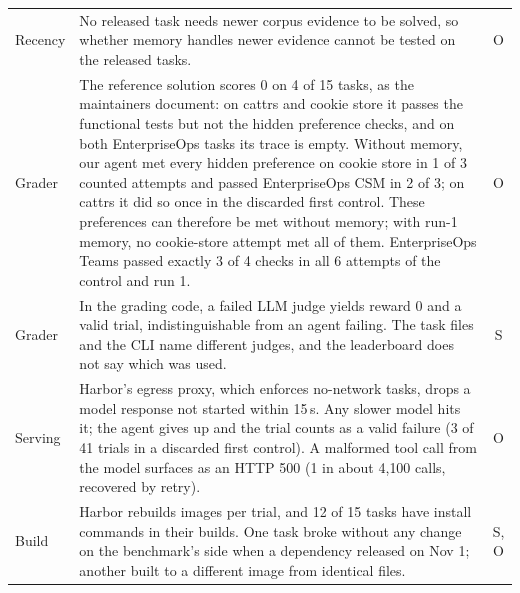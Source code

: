 \begin{table}[t]
\begin{tabular}{@{}p{}p{}c@{}}
Recency & No released task needs newer corpus evidence to be solved, so whether memory handles newer evidence cannot be tested on the released tasks. & O \\
Grader & The reference solution scores 0 on 4 of 15 tasks, as the maintainers document: on cattrs and cookie store it passes the functional tests but not the hidden preference checks, and on both EnterpriseOps tasks its trace is empty. Without memory, our agent met every hidden preference on cookie store in 1 of 3 counted attempts and passed EnterpriseOps CSM in 2 of 3; on cattrs it did so once in the discarded first control. These preferences can therefore be met without memory; with run-1 memory, no cookie-store attempt met all of them. EnterpriseOps Teams passed exactly 3 of 4 checks in all 6 attempts of the control and run 1. & O \\
Grader & In the grading code, a failed LLM judge yields reward 0 and a valid trial, indistinguishable from an agent failing. The task files and the CLI name different judges, and the leaderboard does not say which was used. & S \\
Serving & Harbor's egress proxy, which enforces no-network tasks, drops a model response not started within 15\,s. Any slower model hits it; the agent gives up and the trial counts as a valid failure (3 of 41 trials in a discarded first control). A malformed tool call from the model surfaces as an HTTP 500 (1 in about 4{,}100 calls, recovered by retry). & O \\
Build & Harbor rebuilds images per trial, and 12 of 15 tasks have install commands in their builds. One task broke without any change on the benchmark's side when a dependency released on Nov 1; another built to a different image from identical files. & S, O \\
\bottomrule
\end{tabular}
\end{table}

